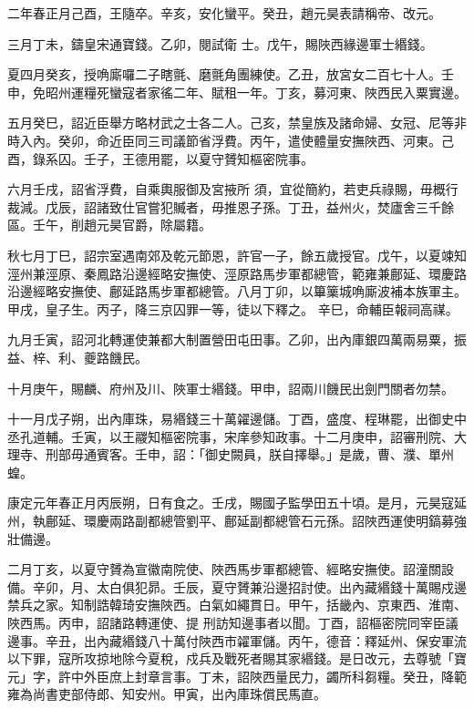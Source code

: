 \begin{pinyinscope}
 二年春正月己酉，王隨卒。辛亥，安化蠻平。癸丑，趙元昊表請稱帝、改元。



 三月丁未，鑄皇宋通寶錢。乙卯，閱試衛
 士。戊午，賜陜西緣邊軍士緡錢。



 夏四月癸亥，授唃廝囉二子瞎氈、磨氈角團練使。乙丑，放宮女二百七十人。壬申，免昭州運糧死蠻寇者家徭二年、賦租一年。丁亥，募河東、陜西民入粟實邊。



 五月癸巳，詔近臣舉方略材武之士各二人。己亥，禁皇族及諸命婦、女冠、尼等非時入內。癸卯，命近臣同三司議節省浮費。丙午，遣使體量安撫陜西、河東。己酉，錄系囚。壬子，王德用罷，以夏守贇知樞密院事。



 六月壬戌，詔省浮費，自乘輿服御及宮掖所
 須，宜從簡約，若吏兵祿賜，毋概行裁減。戊辰，詔諸致仕官嘗犯贓者，毋推恩子孫。丁丑，益州火，焚廬舍三千餘區。壬午，削趙元昊官爵，除屬籍。



 秋七月丁巳，詔宗室遇南郊及乾元節恩，許官一子，餘五歲授官。戊午，以夏竦知涇州兼涇原、秦鳳路沿邊經略安撫使、涇原路馬步軍都總管，範雍兼鄜延、環慶路沿邊經略安撫使、鄜延路馬步軍都總管。八月丁卯，以篳篥城唃廝波補本族軍主。甲戌，皇子生。丙子，降三京囚罪一等，徒以下釋之。
 辛巳，命輔臣報祠高禖。



 九月壬寅，詔河北轉運使兼都大制置營田屯田事。乙卯，出內庫銀四萬兩易粟，振益、梓、利、夔路饑民。



 十月庚午，賜麟、府州及川、陜軍士緡錢。甲申，詔兩川饑民出劍門關者勿禁。



 十一月戊子朔，出內庫珠，易緡錢三十萬糴邊儲。丁酉，盛度、程琳罷，出御史中丞孔道輔。壬寅，以王鬷知樞密院事，宋庠參知政事。十二月庚申，詔審刑院、大理寺、刑部毋通賓客。壬申，詔：「御史闕員，朕自擇舉。」是歲，曹、濮、單州蝗。



 康定元年春正月丙辰朔，日有食之。壬戌，賜國子監學田五十頃。是月，元昊寇延州，執鄜延、環慶兩路副都總管劉平、鄜延副都總管石元孫。詔陜西運使明鎬募強壯備邊。



 二月丁亥，以夏守贇為宣徽南院使、陜西馬步軍都總管、經略安撫使。詔潼關設備。辛卯，月、太白俱犯昴。壬辰，夏守贇兼沿邊招討使。出內藏緡錢十萬賜戍邊禁兵之家。知制誥韓琦安撫陜西。白氣如繩貫日。甲午，括畿內、京東西、淮南、陜西馬。丙申，詔諸路轉運使、提
 刑訪知邊事者以聞。丁酉，詔樞密院同宰臣議邊事。辛丑，出內藏緡錢八十萬付陜西市糴軍儲。丙午，德音：釋延州、保安軍流以下罪，寇所攻掠地除今夏稅，戍兵及戰死者賜其家緡錢。是日改元，去尊號「寶元」字，許中外臣庶上封章言事。丁未，詔陜西量民力，蠲所科芻糧。癸丑，降範雍為尚書吏部侍郎、知安州。甲寅，出內庫珠償民馬直。




\end{pinyinscope}
